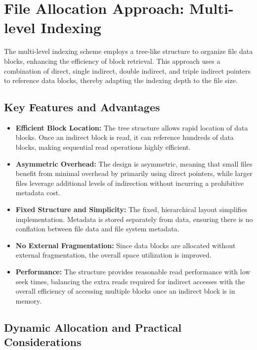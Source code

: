 \section{File Allocation Approach: Multi-level Indexing}

The multi-level indexing scheme employs a tree-like structure to organize file data blocks, enhancing the efficiency of block retrieval. This approach uses a combination of direct, single indirect, double indirect, and triple indirect pointers to reference data blocks, thereby adapting the indexing depth to the file size.

\subsection*{Key Features and Advantages}

\begin{itemize}
    \item \textbf{Efficient Block Location:} The tree structure allows rapid location of data blocks. Once an indirect block is read, it can reference hundreds of data blocks, making sequential read operations highly efficient.
    
    \item \textbf{Asymmetric Overhead:} The design is asymmetric, meaning that small files benefit from minimal overhead by primarily using direct pointers, while larger files leverage additional levels of indirection without incurring a prohibitive metadata cost.
    
    \item \textbf{Fixed Structure and Simplicity:} The fixed, hierarchical layout simplifies implementation. Metadata is stored separately from data, ensuring there is no conflation between file data and file system metadata.
    
    \item \textbf{No External Fragmentation:} Since data blocks are allocated without external fragmentation, the overall space utilization is improved.
    
    \item \textbf{Performance:} The structure provides reasonable read performance with low seek times, balancing the extra reads required for indirect accesses with the overall efficiency of accessing multiple blocks once an indirect block is in memory.
\end{itemize}

\subsection*{Dynamic Allocation and Practical Considerations}

